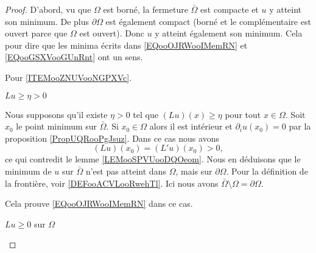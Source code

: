 \begin{proof}
    D'abord, vu que \( \Omega\) est borné, la fermeture \( \bar \Omega\) est compacte et \( u\) y atteint son minimum. De plus \( \partial \Omega\) est également compact (borné et le complémentaire est ouvert parce que \( \Omega\) est ouvert). Donc \( u\) y atteint également son minimum. Cela pour dire que les minima écrits dans \eqref{EQooOJRWooIMemRN} et \eqref{EQooGSXVooGUnRnt} ont un sens.

    Pour \ref{ITEMooZNUVooNGPXVc}.

    \begin{subproof}
        \item[\( Lu\geq \eta>0\)]

            Nous supposons qu'il existe \( \eta>0\) tel que \( (Lu)(x)\geq \eta \) pour tout \( x\in \Omega\). Soit \( x_0\) le point minimum sur \(\bar \Omega\). Si \( x_0\in \Omega\) alors il est intérieur et \( \partial_iu(x_0)=0\) par la proposition \ref{PropUQRooPgJsuz}. Dans ce cas nous avons
            \begin{equation}
                (Lu)(x_0)=(L'u)(x_0)> 0,
            \end{equation}
            ce qui contredit le lemme \ref{LEMooSPVUooDQOeom}. Nous en déduisons que le minimum de \( u\) sur \( \bar \Omega\) n'est pas atteint dans \( \Omega\), mais sur \( \partial\Omega\). Pour la définition de la frontière, voir \ref{DEFooACVLooRwehTl}. Ici nous avons \( \bar\Omega\setminus\Omega=\partial\Omega\).

            Cela prouve \eqref{EQooOJRWooIMemRN} dans ce cas.

        \item[\( Lu\geq 0\) sur \( \Omega\)] 


\end{subproof}
\end{proof}
